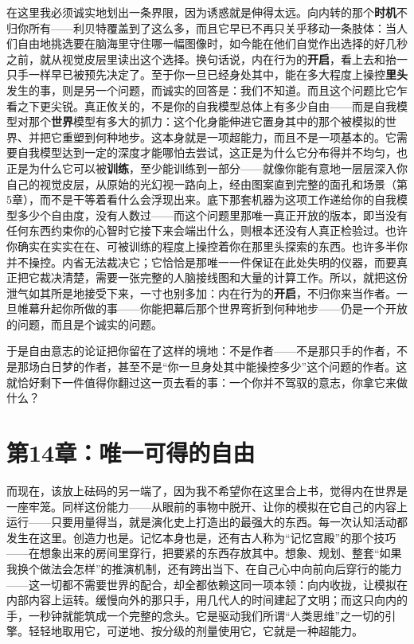 \documentclass[11pt, twoside, openright]{book}
\begin{document}
在这里我必须诚实地划出一条界限，因为诱惑就是伸得太远。向内转的那个\textbf{时机}不归你所有------利贝特覆盖到了这么多，而且它早已不再只关乎移动一条肢体：当人们自由地挑选要在脑海里守住哪一幅图像时，如今能在他们自觉作出选择的好几秒之前，就从视觉皮层里读出这个选择。换句话说，内在行为的\textbf{开启}，看上去和抬一只手一样早已被预先决定了。至于你一旦已经身处其中，能在多大程度上操控\textbf{里头}发生的事，则是另一个问题，而诚实的回答是：我们不知道。而且这个问题比它乍看之下更尖锐。真正攸关的，不是你的自我模型总体上有多少自由------而是自我模型对那个\textbf{世界}模型有多大的抓力：这个化身能伸进它置身其中的那个被模拟的世界、并把它重塑到何种地步。这本身就是一项超能力，而且不是一项基本的。它需要自我模型达到一定的深度才能哪怕去尝试，这正是为什么它分布得并不均匀，也正是为什么它可以被\textbf{训练}，至少能训练到一部分------就像你能有意地一层层深入你自己的视觉皮层，从原始的光幻视一路向上，经由图案直到完整的面孔和场景（第5章），而不是干等着看什么会浮现出来。底下那套机器为这项工作递给你的自我模型多少个自由度，没有人数过------而这个问题里那唯一真正开放的版本，即当没有任何东西约束你的心智时它接下来会端出什么，则根本还没有人真正检验过。也许你确实在实实在在、可被训练的程度上操控着你在那里头探索的东西。也许多半你并不操控。内省无法裁决它；它恰恰是那唯一一件保证在此处失明的仪器，而要真正把它裁决清楚，需要一张完整的人脑接线图和大量的计算工作。所以，就把这份泄气如其所是地接受下来，一寸也别多加：内在行为的\textbf{开启}，不归你来当作者。一旦帷幕升起你所做的事------你能把幕后那个世界弯折到何种地步------仍是一个开放的问题，而且是个诚实的问题。

于是自由意志的论证把你留在了这样的境地：不是作者------不是那只手的作者，不是那场白日梦的作者，甚至不是“你一旦身处其中能操控多少”这个问题的作者。这就恰好剩下一件值得你翻过这一页去看的事：一个你并不驾驭的意志，你拿它来做什么？


\chapter*{第14章：唯一可得的自由}

而现在，该放上砝码的另一端了，因为我不希望你在这里合上书，觉得内在世界是一座牢笼。同样这份能力------从眼前的事物中脱开、让你的模拟在它自己的内容上运行------只要用量得当，就是演化史上打造出的最强大的东西。每一次认知活动都发生在这里。创造力也是。记忆本身也是，还有古人称为“记忆宫殿”的那个技巧------在想象出来的房间里穿行，把要紧的东西存放其中。想象、规划、整套“如果我换个做法会怎样”的推演机制，还有跨出当下、在自己心中向前向后穿行的能力------这一切都不需要世界的配合，却全都依赖这同一项本领：向内收拢，让模拟在内部内容上运转。缓慢向外的那只手，用几代人的时间建起了文明；而这只向内的手，一秒钟就能筑成一个完整的念头。它是驱动我们所谓“人类思维”之一切的引擎。轻轻地取用它，可逆地、按分级的剂量使用它，它就是一种超能力。
\end{document}
